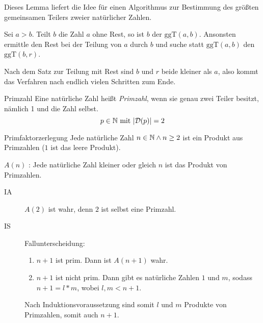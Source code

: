 \par\medskip
Dieses Lemma liefert die Idee für einen Algorithmus zur Bestimmung des größten gemeinsamen Teilers zweier natürlicher Zahlen.

Sei $a>b$. Teilt $b$ die Zahl $a$ ohne Rest, so ist $b$ der $\mathrm{ggT}(a,b)$. Ansonsten ermittle den Rest bei der Teilung von $a$ durch $b$ und suche statt $\mathrm{ggT}(a,b)$ den $\mathrm{ggT}(b,r)$.

Nach dem Satz zur Teilung mit Rest sind $b$ und $r$ beide kleiner als $a$, also kommt das Verfahren nach endlich vielen Schritten zum Ende.

\begin{definition}{Primzahl}
	Eine natürliche Zahl heißt \emph{Primzahl}, wenn sie genau zwei Teiler besitzt, nämlich 1 und die Zahl selbst.
	\begin{equation*}
	  p\in\mathbb{N} \text{ mit } |\mathcal{D}(p)| = 2
	\end{equation*}
\end{definition}

\begin{satz}{Primfaktorzerlegung}
  Jede natürliche Zahl $n\in\mathbb{N} \wedge n\geq2$ ist ein Produkt aus Primzahlen ($1$ ist das leere Produkt).
\end{satz}

\beweis
$A(n)$ : \glqq Jede natürliche Zahl kleiner oder gleich $n$ ist das Produkt von Primzahlen.\grqq

\begin{description}
  \item[IA] $A(2)$ ist wahr, denn $2$ ist selbst eine Primzahl.
  \item[IS] Fallunterscheidung:
  \begin{enumerate}
    \item $n+1$ ist prim. Dann ist $A(n+1)$ wahr.
    \item $n+1$ ist nicht prim. Dann gibt es natürliche Zahlen $1$ und $m$, sodass $n+1=l* m$, wobei $l,m<n+1$.
  \end{enumerate}
  Nach Induktionsvoraussetzung sind somit $l$ und $m$ Produkte von Primzahlen, somit auch $n+1$.
\end{description}

